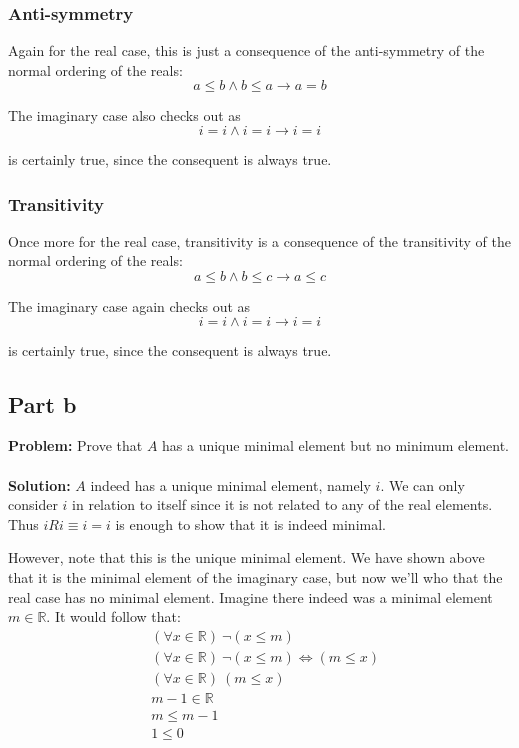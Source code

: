 \documentclass{article}
\begin{document}
\subsubsection*{Anti-symmetry}
Again for the real case, this is just a consequence of the anti-symmetry of the normal ordering of the reals:
$$a\le b\wedge b\le a\rightarrow a=b$$

The imaginary case also checks out as
$$i=i\wedge i=i\rightarrow i=i$$

is certainly true, since the consequent is always true.

\subsubsection*{Transitivity}
Once more for the real case, transitivity is a consequence of the transitivity of the normal ordering of the reals:
$$a\le b\wedge b\le c\rightarrow a\le c$$

The imaginary case again checks out as
$$i=i\wedge i=i\rightarrow i=i$$

is certainly true, since the consequent is always true.

\subsection*{Part b}
\textbf{Problem:} Prove that $A$ has a unique minimal element but no minimum element.
\\\\
\textbf{Solution:} $A$ indeed has a unique minimal element, namely $i$. We can only consider $i$ in relation to itself since it is not related to any of the real elements. Thus $iRi\equiv i=i$ is enough to show that it is indeed minimal.

However, note that this is the unique minimal element. We have shown above that it is the minimal element of the imaginary case, but now we'll who that the real case has no minimal element. Imagine there indeed was a minimal element $m\in\mathbb R$. It would follow that:
\begin{align*}
  &(\forall x\in\mathbb R)\ \neg(x\le m)\tag{def. of minimal}\\
  &(\forall x\in\mathbb R)\ \neg(x\le m)\iff(m\le x) \tag{total ordering of $\mathbb R$}\\
  &(\forall x\in\mathbb R)\ (m\le x)\\
  &m-1\in\mathbb R\tag{closure of subtraction under $\mathbb R$}\\
  &m\le m-1\\
  &1\le 0
\end{align*}
\end{document}
